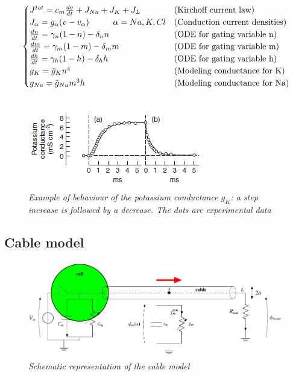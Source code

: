 \documentclass[a4paper]{article}
\begin{document}
	\begin{equation}
		\begin{cases}
		J^{tot} = c_m \frac{d v}{d t} + J_{Na} + J_K +J_L  & \text{(Kirchoff current law)}\\
		J_\alpha = g_\alpha (v-v_\alpha) \hspace{1 cm}  \alpha = Na,K,Cl & \text{(Conduction current densities)}\\
		\frac{dn}{dt} = \gamma_n(1-n) - \delta_n n & \text{(ODE for gating variable n)} \\
		\frac{dm}{dt} = \gamma_m(1-m) - \delta_m m & \text{(ODE for gating variable m)}\\
		\frac{dh}{dt} = \gamma_h(1-h) - \delta_h h & \text{(ODE for gating variable h)}\\
		 g_K = \bar{g}_K n^4 & \text{(Modeling conductance for K)}\\
		 g_{Na} = \bar{g}_{Na} m^3h  & \text{(Modeling conductance for Na)}
		
		\end{cases}
	\end{equation}
	
	\begin{figure}[H]
		\begin{center}
			\includegraphics[scale=1.1]{gk.png} 
		\end{center} 
		\caption{\textit{Example of behaviour of the potassium conductance $g_K$: a step increase is followed by a decrease. The dots are experimental data}}
		
	\end{figure}


\subsection{Cable model}

\begin{figure}[H]
	\begin{center}
		\hspace*{-0.7cm}
		\includegraphics[scale=0.7]{cable.png} 
	\end{center} 
	\caption{\textit{Schematic representation of the cable model}}
	
\end{figure}
\end{document}
